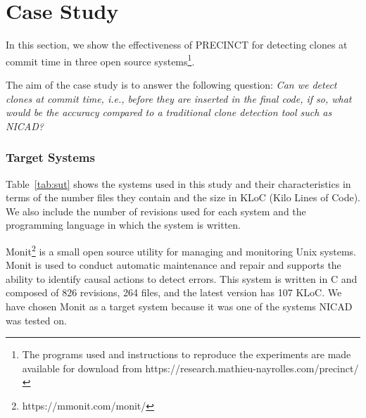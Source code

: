 \section{Case Study}
\label{sec:Experimentations}

In this section, we show the effectiveness of PRECINCT for
detecting clones at commit time in three open source systems\footnote{The programs used and instructions to reproduce the experiments are made available for download from https://research.mathieu-nayrolles.com/precinct/}.

The aim of the case study is to answer the following question: \textit{Can we detect clones at commit time, i.e., before they are inserted in the final code, if so, what would be the accuracy compared to a traditional clone detection tool such as NICAD?}

\subsubsection{Target Systems}
\label{sub:Target Systems}

Table~\ref{tab:sut} shows the systems used in this study and their characteristics in terms of the number files they contain and the size in KLoC (Kilo Lines of Code). We also include the number of revisions used for each system and the programming language in which the system is written.

\begin{table}[]
\centering
\caption{List of Target Systems in Terms of Files and Kilo Line of Code (KLOC) at current version and Language}
\label{tab:sut}
\end{table}

Monit\footnote{https://mmonit.com/monit/} is a small open source utility for managing and monitoring Unix systems.
Monit is used to conduct automatic maintenance and repair and supports the ability to identify causal actions to detect errors.
This system is written in C and composed of 826 revisions, 264 files, and the latest version has 107 KLoC.
We have chosen Monit as a target system because it was one of the systems NICAD was tested on.

